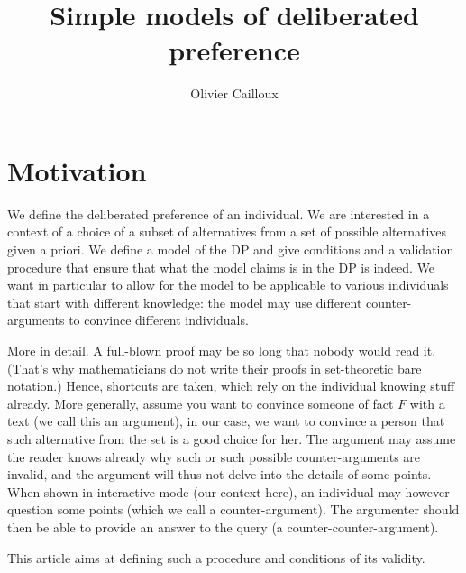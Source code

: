 \documentclass[version=last, pagesize, twoside=off, bibliography=totoc, DIV=calc, fontsize=14pt, a4paper, french, english]{scrartcl}
\begin{document}
\title{Simple models of deliberated preference}
\author{Olivier Cailloux}
\makeatletter
\makeatother
\maketitle

\section{Motivation}
We define the deliberated preference of an individual. We are interested in a context of a choice of a subset of alternatives from a set of possible alternatives given a priori. We define a model of the DP and give conditions and a validation procedure that ensure that what the model claims is in the DP is indeed. We want in particular to allow for the model to be applicable to various individuals that start with different knowledge: the model may use different counter-arguments to convince different individuals.

More in detail. A full-blown proof may be so long that nobody would read it. (That’s why mathematicians do not write their proofs in set-theoretic bare notation.) Hence, shortcuts are taken, which rely on the individual knowing stuff already. More generally, assume you want to convince someone of fact $F$ with a text (we call this an argument), in our case, we want to convince a person that such alternative from the set is a good choice for her. The argument may assume the reader knows already why such or such possible counter-arguments are invalid, and the argument will thus not delve into the details of some points. When shown in interactive mode (our context here), an individual may however question some points (which we call a counter-argument). The argumenter should then be able to provide an answer to the query (a counter-counter-argument).

This article aims at defining such a procedure and conditions of its validity.
\end{document}

